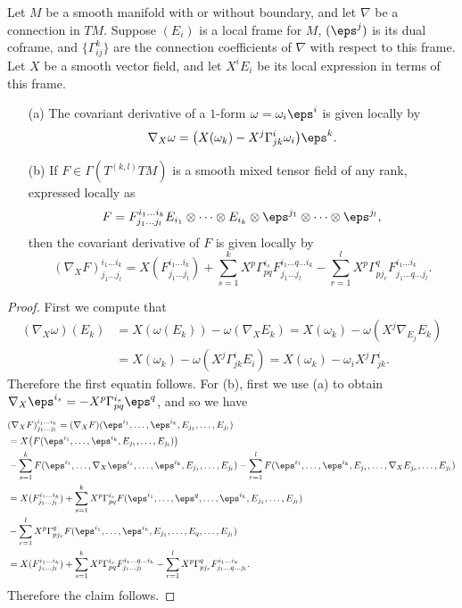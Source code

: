 \begin{proposition}\label{connection tensor frame expression}
Let $M$ be a smooth manifold with or without boundary, and let $\nabla$ be a connection in $TM$. 
Suppose $(E_i)$ is a local frame for $M$, $(\eps^j)$ is its dual coframe, and $\{\Gamma_{ij}^k\}$ 
are the connection coefficients of $\nabla$ with respect to this frame. Let $X$ be a smooth 
vector field, and let $X^iE_i$ be its local expression in terms of this frame.
\begin{itemize}
\item[(a)] The covariant derivative of a $1$-form $\omega=\omega_i\eps^i$ is given locally 
by 
\[\nabla_X\omega=\big(X(\omega_k)-X^j\Gamma_{jk}^i\omega_i\big)\eps^k.\]
\item[(b)] If $F\in\Gamma(T^{(k,l)}TM)$ is a smooth mixed tensor field of any rank, expressed
locally as 
\[F=F^{i_1\dots i_k}_{j_1\dots j_l}E_{i_1}\otimes\cdots\otimes E_{i_k}\otimes\eps^{j_1}\otimes\cdots\otimes\eps^{j_l},\]
then the covariant derivative of $F$ is given locally by
\[(\nabla_XF)^{i_1\dots i_k}_{j_1\dots j_l}=X(F^{i_1\dots i_k}_{j_1\dots j_l})+\sum_{s=1}^{k}X^p\Gamma_{pq}^{i_s}F^{i_1\dots q\dots i_k}_{j_1\dots j_l}-\sum_{r=1}^{l}X^p\Gamma_{pj_r}^qF^{i_1\dots i_k}_{j_1\dots q\dots j_l}.\]
\end{itemize}
\end{proposition}
\begin{proof}
First we compute that
\begin{align*}
(\nabla_X\omega)(E_k)&=X(\omega(E_k))-\omega(\nabla_XE_k)=X(\omega_k)-\omega(X^j\nabla_{E_j}E_k)\\
&=X(\omega_k)-\omega(X^j\Gamma_{jk}^iE_i)=X(\omega_k)-\omega_iX^j\Gamma_{jk}^i.
\end{align*}
Therefore the first equatin follows. For (b), first we use (a) to obtain $\nabla_X\eps^{i_s}=-X^p\Gamma_{pq}^{i_s}\eps^q$, and so we have
\begin{align*}
&(\nabla_XF)^{i_1\dots i_k}_{j_1\dots j_l}=(\nabla_XF)(\eps^{i_1},\dots,\eps^{i_k},E_{j_1},\dots,E_{j_l})\\
&=X\big(F(\eps^{i_1},\dots,\eps^{i_k},E_{j_1},\dots,E_{j_l})\big)\\
&-\sum_{s=1}^{k}F(\eps^{i_1},\dots,\nabla_{X}\eps^{i_s},\dots,\eps^{i_k},E_{j_1},\dots,E_{j_l})-\sum_{r=1}^{l}F(\eps^{i_1},\dots,\eps^{i_k},E_{j_1},\dots,\nabla_{X}E_{j_r},\dots,E_{j_l})\\
&=X(F^{i_1\dots i_k}_{j_1\dots j_l})+\sum_{s=1}^{k}X^p\Gamma_{pq}^{i_s}F(\eps^{i_1},\dots,\eps^q,\dots,\eps^{i_k},E_{j_1},\dots,E_{j_l})\\
&-\sum_{r=1}^{l}X^p\Gamma_{pj_r}^qF(\eps^{i_1},\dots,\eps^{i_k},E_{j_1},\dots,E_q,\dots,E_{j_l})\\
&=X(F^{i_1\dots i_k}_{j_1\dots j_l})+\sum_{s=1}^{k}X^p\Gamma_{pq}^{i_s}F^{i_1\dots q\dots i_k}_{j_1\dots j_l}-\sum_{r=1}^{l}X^p\Gamma_{pj_r}^qF^{i_1\dots i_k}_{j_1\dots q\dots j_l}.
\end{align*}
Therefore the claim follows.
\end{proof}
